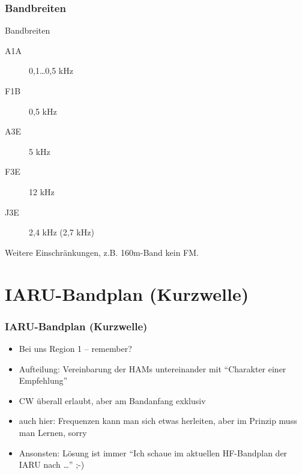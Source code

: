 \begin{frame}
    \frametitle{Bandbreiten}

    \begin{block}{Bandbreiten}
    \begin{description}
        \item[A1A] 0,1\ldots0,5 kHz 
        \item[F1B] 0,5 kHz 
        \item[A3E] 5 kHz 
        \item[F3E] 12 kHz 
        \item[J3E] 2,4 kHz (2,7 kHz)
    \end{description}
    \end{block}

    Weitere Einschränkungen, z.B. 160m-Band kein FM.

\end{frame}


\section{IARU-Bandplan (Kurzwelle)}

\begin{frame}
    \frametitle{IARU-Bandplan (Kurzwelle)}

    
    \begin{itemize}
        \item Bei uns Region 1 -- remember?
        \item Aufteilung: Vereinbarung der HAMs untereinander mit ``Charakter
              einer Empfehlung''
        \item CW überall erlaubt, aber am Bandanfang exklusiv
        \item auch hier: Frequenzen kann man sich etwas herleiten, aber im
              Prinzip muss man Lernen, sorry
        \item Ansonsten: Lösung ist immer ``Ich schaue im aktuellen HF-Bandplan
              der IARU nach \ldots'' ;-)
    \end{itemize}

\end{frame}

